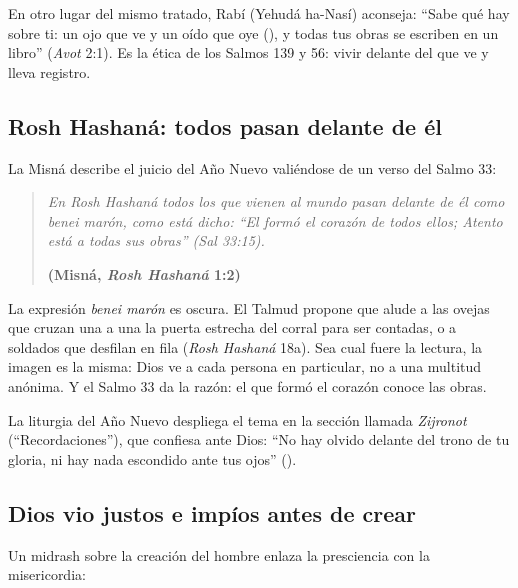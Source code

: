 En otro lugar del mismo tratado, Rabí (Yehudá ha-Nasí) aconseja: ``Sabe qué hay sobre ti: un ojo que ve y un oído que oye (), y todas tus obras se escriben en un libro'' (\emph{Avot} 2:1). Es la ética de los Salmos 139 y 56: vivir delante del que ve y lleva registro.


\subsection{Rosh Hashaná: todos pasan delante de él}
La Misná describe el juicio del Año Nuevo valiéndose de un verso del Salmo 33:

\begin{quote}\itshape
En Rosh Hashaná todos los que vienen al mundo pasan delante de él como \emph{benei marón}, como está dicho: ``El formó el corazón de todos ellos; Atento está a todas sus obras'' (Sal 33:15).\par\hfill{\upshape\small\bfseries\textcolor{azulp}{(Misná, \emph{Rosh Hashaná} 1:2)}}
\end{quote}

La expresión \emph{benei marón} es oscura. El Talmud propone que alude a las ovejas que cruzan una a una la puerta estrecha del corral para ser contadas, o a soldados que desfilan en fila (\emph{Rosh Hashaná} 18a). Sea cual fuere la lectura, la imagen es la misma: Dios ve a cada persona en particular, no a una multitud anónima. Y el Salmo 33 da la razón: el que formó el corazón conoce las obras.

La liturgia del Año Nuevo despliega el tema en la sección llamada \emph{Zijronot} (``Recordaciones''), que confiesa ante Dios: ``No hay olvido delante del trono de tu gloria, ni hay nada escondido ante tus ojos'' ().


\subsection{Dios vio justos e impíos antes de crear}
Un midrash sobre la creación del hombre enlaza la presciencia con la misericordia:

